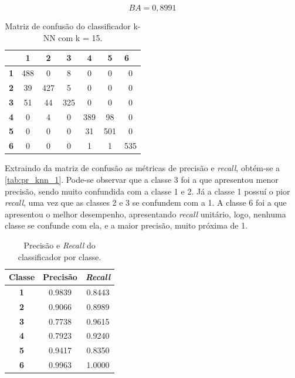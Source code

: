\begin{equation}\label{eq:ba_knn_1}
	BA = 0,8991
\end{equation}

\begin{table}[H]
	\centering
	\begin{tabular}{c||c|c|c|c|c|c|}
		\cline{2-7}
		& \textbf{1} & \textbf{2} & \textbf{3} & \textbf{4} & \textbf{5} & \multicolumn{1}{l|}{\textbf{6}} \\ \hline \hline
		\multicolumn{1}{|c||}{\textbf{1}} & 488 & 0   & 8   & 0   & 0   & 0   \\ \hline
		\multicolumn{1}{|c||}{\textbf{2}} & 39  & 427 & 5   & 0   & 0   & 0   \\ \hline
		\multicolumn{1}{|c||}{\textbf{3}} & 51  & 44  & 325 & 0   & 0   & 0   \\ \hline
		\multicolumn{1}{|c||}{\textbf{4}} & 0   & 4   & 0   & 389 & 98  & 0   \\ \hline
		\multicolumn{1}{|c||}{\textbf{5}} & 0   & 0   & 0   & 31  & 501 & 0   \\ \hline
		\multicolumn{1}{|c||}{\textbf{6}} & 0   & 0   & 0   & 1   & 1   & 535 \\ \hline
	\end{tabular}
	\caption{Matriz de confusão do classificador k-NN com k = 15.}
	\label{tab:mc_knn_1}
\end{table}

Extraindo da matriz de confusão as métricas de precisão e \textit{recall}, obtém-se a \autoref{tab:pr_knn_1}. Pode-se observar que a classe 3 foi a que apresentou menor precisão, sendo muito confundida com a classe 1 e 2. Já a classe 1 possuí o pior \textit{recall}, uma vez que as classes 2 e 3 se confundem com a 1. A classe 6 foi a que apresentou o melhor desempenho, apresentando \textit{recall} unitário, logo, nenhuma classe se confunde com ela, e a maior precisão, muito próxima de 1.


\begin{table}[H]
	\centering
	\begin{tabular}{c|c|c}
		\textbf{Classe} & \textbf{Precisão} & \textbf{\textit{Recall}} \\ \hline
		\textbf{1}      & 0.9839 & 0.8443 \\
		\textbf{2}      & 0.9066 & 0.8989 \\
		\textbf{3}      & 0.7738 & 0.9615 \\
		\textbf{4}      & 0.7923 & 0.9240 \\
		\textbf{5}      & 0.9417 & 0.8350 \\
		\textbf{6}      & 0.9963 & 1.0000
	\end{tabular}
	\caption{Precisão e \textit{Recall} do classificador por classe.}
	\label{tab:pr_knn_1}
\end{table}

